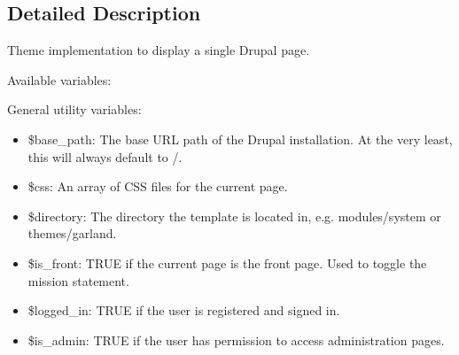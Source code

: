 \subsection{Detailed Description}
Theme implementation to display a single Drupal page.

Available variables:

General utility variables:\begin{itemize}
\item \$base\_\-path: The base URL path of the Drupal installation. At the very least, this will always default to /.\item \$css: An array of CSS files for the current page.\item \$directory: The directory the template is located in, e.g. modules/system or themes/garland.\item \$is\_\-front: TRUE if the current page is the front page. Used to toggle the mission statement.\item \$logged\_\-in: TRUE if the user is registered and signed in.\item \$is\_\-admin: TRUE if the user has permission to access administration pages.\end{itemize}


